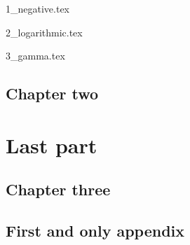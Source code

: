 \documentclass{book}
\begin{document}
{1_negative.tex}

{2_logarithmic.tex}

{3_gamma.tex}

\chapter{Chapter two}


\part{Last part}
\chapter{Chapter three}

\appendix
\chapter{First and only appendix}

\backmatter
\end{document}
